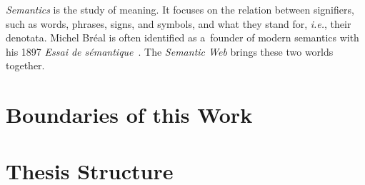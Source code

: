 \emph{Semantics} is the study of meaning.
It focuses on the relation between signifiers, such as words, phrases, signs, and symbols,
and what they stand for, \emph{i.e.}, their denotata.
Michel Bréal is often identified as a~founder of modern semantics with his 1897
\emph{Essai de sémantique}~\cite{Breal1897}.
The \emph{Semantic Web} brings these two worlds together.

\section{Boundaries of this Work}

\section{Thesis Structure}